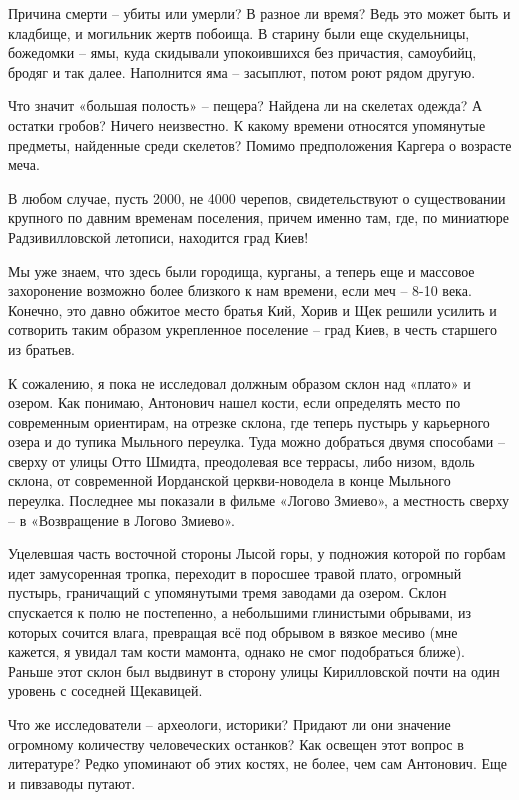 Причина смерти – убиты или умерли? В разное ли время? Ведь это может быть и кладбище, и могильник жертв побоища. В старину были еще скудельницы, божедомки – ямы, куда скидывали упокоившихся без причастия, самоубийц, бродяг и так далее. Наполнится яма – засыплют, потом роют рядом другую. 

Что значит «большая полость» – пещера? Найдена ли на скелетах одежда? А остатки гробов? Ничего неизвестно. К какому времени относятся упомянутые предметы, найденные среди скелетов? Помимо предположения Каргера о возрасте меча.

В любом случае, пусть 2000, не 4000 черепов, свидетельствуют о существовании крупного по давним временам поселения, причем именно там, где, по миниатюре Радзивилловской летописи, находится град Киев!

Мы уже знаем, что здесь были городища, курганы, а теперь еще и массовое захоронение возможно более близкого к нам времени, если меч – 8-10 века. Конечно, это давно обжитое место братья Кий, Хорив и Щек решили усилить и сотворить таким образом укрепленное поселение – град Киев, в честь старшего из братьев.

К сожалению, я пока не исследовал должным образом склон над «плато» и озером. Как понимаю, Антонович нашел кости, если определять место по современным ориентирам, на отрезке склона, где теперь пустырь у карьерного озера и до тупика Мыльного переулка. Туда можно добраться двумя способами – сверху от улицы Отто Шмидта, преодолевая все террасы, либо низом, вдоль склона, от современной Иорданской церкви-новодела в конце Мыльного переулка. Последнее мы показали в фильме «Логово Змиево», а местность сверху – в «Возвращение в Логово Змиево».

Уцелевшая часть восточной стороны Лысой горы, у подножия которой по горбам идет замусоренная тропка, переходит в поросшее травой плато, огромный пустырь, граничащий с упомянутыми тремя заводами да озером. Склон спускается к полю не постепенно, а небольшими глинистыми обрывами, из которых сочится влага, превращая всё под обрывом в вязкое месиво (мне кажется, я увидал там кости мамонта, однако не смог подобраться ближе). Раньше этот склон был выдвинут в сторону улицы Кирилловской почти на один уровень с соседней Щекавицей.

Что же исследователи – археологи, историки? Придают ли они значение огромному количеству человеческих останков? Как освещен этот вопрос в литературе? Редко упоминают об этих костях, не более, чем сам Антонович. Еще и пивзаводы путают. 

